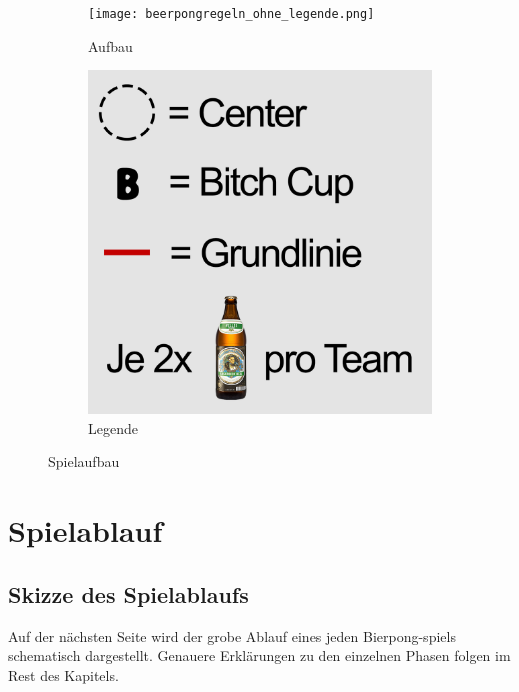 \documentclass[a5paper, 12pt]{book}
\begin{document}
\begin{figure}
    \centering
    \begin{subfigure}[h]{0.69\textwidth}
    \centering
    \texttt{[image: beerpongregeln\_ohne\_legende.png]}
    \caption{Aufbau}
    \end{subfigure}
    \hfill
   \begin{subfigure}[h]{0.29\textwidth}
   \centering
\includegraphics[width=\textwidth]{legende.png}
\caption{Legende}
   \end{subfigure}
    \caption{Spielaufbau}
    \label{fig:spielaufbau}
\end{figure}

\chapter{Spielablauf}\label{chap:spielablauf}
\section{Skizze des Spielablaufs}\label{sec:skizze des spielablaufs}
Auf der nächsten Seite wird der grobe Ablauf eines jeden Bierpong-spiels schematisch dargestellt. Genauere Erklärungen zu den einzelnen Phasen folgen im Rest des Kapitels.
\end{document}
